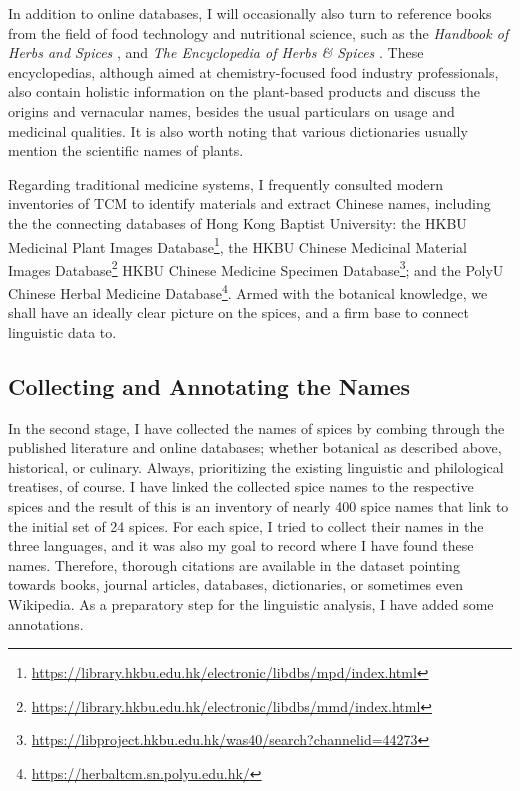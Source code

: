 In addition to online databases, I will occasionally also turn to reference books from the field of food technology and nutritional science, such as the \textit{Handbook of Herbs and Spices} \autocite{peter_handbook_2012,peter_handbook_2006}, and \textit{The Encyclopedia of Herbs \& Spices} \autocite{ravindran_encyclopedia_2017}. These encyclopedias, although aimed at chemistry-focused food industry professionals, also contain holistic information on the plant-based products and discuss the origins and vernacular names, besides the usual particulars on usage and medicinal qualities. It is also worth noting that various dictionaries usually mention the scientific names of plants.

Regarding traditional medicine systems, I frequently consulted modern inventories of \gls{TCM} to identify materials and extract Chinese names, including the the connecting databases of Hong Kong Baptist University: the HKBU Medicinal Plant Images Database\footnote{\url{https://library.hkbu.edu.hk/electronic/libdbs/mpd/index.html}}, the HKBU Chinese Medicinal Material Images Database\footnote{\url{https://library.hkbu.edu.hk/electronic/libdbs/mmd/index.html}} HKBU Chinese Medicine Specimen Database\footnote{\url{https://libproject.hkbu.edu.hk/was40/search?channelid=44273}}; and the PolyU Chinese Herbal Medicine Database\footnote{\url{https://herbaltcm.sn.polyu.edu.hk/}}. Armed with the botanical knowledge, we shall have an ideally clear picture on the spices, and a firm base to connect linguistic data to.


\subsection{Collecting and Annotating the Names}
\label{sec:collecting_names}

In the second stage, I have collected the names of spices by combing through the published literature and online databases; whether botanical as described above, historical, or culinary. Always, prioritizing the existing linguistic and philological treatises, of course. I have linked the collected spice names to the respective spices and the result of this is an inventory of nearly 400 spice names that link to the initial set of 24 spices. For each spice, I tried to collect their names in the three languages, and it was also my goal to record where I have found these names. Therefore, thorough citations are available in the dataset pointing towards books, journal articles, databases, dictionaries, or sometimes even Wikipedia. As a preparatory step for the linguistic analysis, I have added some annotations. 

